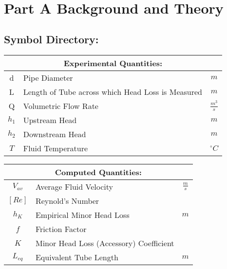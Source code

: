 \documentclass[12pt]{article}
\begin{document}
	\section{Part A Background and Theory}
	\hfill\break\break
	\subsection{Symbol Directory:}
	{
	\centering
	\begin{tabular}{|c|l|c|}
		\hline
		\multicolumn{3}{|c|}{\textbf{Experimental Quantities:}} \\
		\hline
		\hline
		d & Pipe Diameter & $m$\\
		L & Length of Tube across which Head Loss is Measured & $m$ \\
		Q & Volumetric Flow Rate & $\frac{m^3}{s}$\\
		$h_1$ & Upstream Head & $m$ \\
		$h_2$ & Downstream Head & $m$ \\
		$T$ & Fluid Temperature & $^{\circ}C$ \\
		\hline
	\end{tabular}
	}
	\hfill\break\break\break
	{
	\centering
	\begin{tabular}{|c|l|c|}
		\hline
		\multicolumn{3}{|c|}{\textbf{Computed Quantities:}} \\
		\hline
		\hline
		$V_{av}$ & Average Fluid Velocity & $\frac{m}{s}$\\
		$[Re]$ & Reynold's Number & ${}$ \\
		$h_K$ & Empirical Minor Head Loss & $m$\\
		$f$ & Friction Factor & ${}$\\
		$K$ & Minor Head Loss (Accessory) Coefficient & ${}$\\
		$L_{eq}$ & Equivalent Tube Length & $m$\\
		\hline
	\end{tabular}
	}
\end{document}
